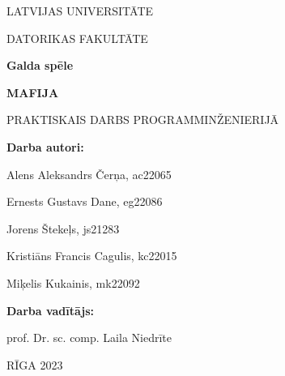 \begin{titlepage}
	\thispagestyle{empty}
	\begin{center}
		\MakeUppercase{\large Latvijas Universitāte}

		\MakeUppercase{\large Datorikas Fakultāte}

		\vfill
		\textbf{\Large Galda spēle}

		\textbf{\MakeUppercase{\Large Mafija}}

		\vspace{1cm}
		\MakeUppercase{Praktiskais darbs programminženierijā}
		\vfill
	\end{center}
	\begin{flushright}
		\textbf{Darba autori:}

		Alens Aleksandrs Čerņa, ac22065

		Ernests Gustavs Dane, eg22086

		Jorens Štekeļs, js21283

		Kristiāns Francis Cagulis, kc22015

		Miķelis Kukainis, mk22092

		\vspace{1cm}
		\textbf{Darba vadītājs:}

		prof. Dr. sc. comp. Laila Niedrīte
	\end{flushright}
	\vspace{1cm}
	\begin{center}
		RĪGA 2023
	\end{center}
\end{titlepage}
